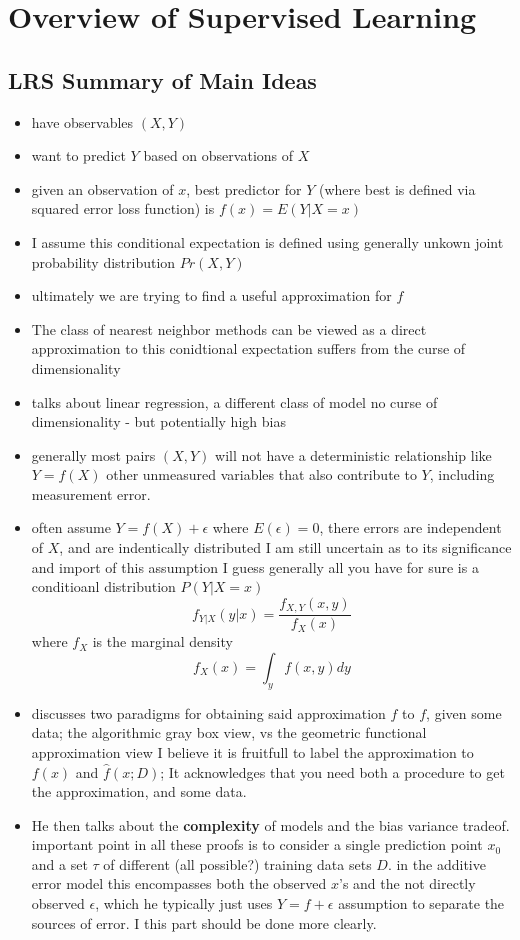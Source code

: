 \documentclass[a4paper]{report}
\newcommand{\gray}{\color{gray}}
\newcommand{\<}{\textless}
\renewcommand{\>}{\textgreater}
\begin{document}
\setcounter{chapter}{1}
\chapter{Overview of Supervised Learning}

\setcounter{section}{-1}
\section{LRS Summary of Main Ideas}
\begin{itemize}
  \item have observables $(X,Y)$
  \item want to predict $Y$ based on observations of $X$
  \item given an observation of $x$, best predictor for $Y$ (where best is defined via squared error loss function) is $f(x) = E(Y | X = x)$
  \item I assume this conditional expectation is defined using generally unkown joint probability distribution $Pr(X,Y)$
  \item ultimately we are trying to find a useful approximation for $f$
  \item The class of nearest neighbor methods can be viewed as a direct approximation to this conidtional expectation
    \subitem suffers from the curse of dimensionality
  \item talks about linear regression, a different class of model
    \subitem no curse of dimensionality - but potentially high bias
  \item generally most pairs $(X,Y)$ will not have a deterministic relationship like $Y = f(X)$
    \subitem other unmeasured variables that also contribute to $Y$, including measurement error.
  \item often assume $Y = f(X) + \epsilon$ where $E(\epsilon) = 0$, there errors are independent of $X$, and are indentically distributed
    \subitem I am still uncertain as to its significance and import of this assumption {\gray
    \subitem I guess generally all you have for sure is a conditioanl distribution $P(Y | X = x)$
    $$ f_{Y|X}(y|x) = \frac{f_{X,Y}(x,y)}{f_X(x)} $$
    where $f_X$ is the marginal density 
  $$f_X(x) = \int_y f(x,y)dy $$ }
  \item discusses two paradigms for obtaining said approximation $\hat{f}$ to $f$, given some data; the algorithmic gray box view, vs the geometric functional approximation view
    \subitem I believe it is fruitfull to label the approximation to $f(x)$ and $\hat{f}(x;D)$; It acknowledges that you need both a procedure to get the approximation, and some data.
  \item He then talks about the {\bf complexity} of models and the bias variance tradeof.
    \subitem important point in all these proofs is to consider a single prediction point $x_0$ and a set $\tau$ of different (all possible?) training data sets $D$.
    \subitem in the additive error model this encompasses both the observed $x$'s and the not directly observed $\epsilon$, which he typically just uses $Y = f + \epsilon$ assumption to separate the sources of error.
    \subitem I this part should be done more clearly.
\end{itemize}
\end{document}
